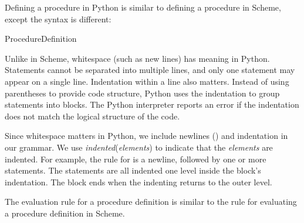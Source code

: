 Defining a procedure in Python is similar to defining a procedure in Scheme, except the syntax is different:
\begin{bnfgrammarm}{ProcedureDefinition}
\ \\
\end{bnfgrammarm}

Unlike in Scheme, whitespace (such as new lines) has meaning in Python. Statements cannot be separated into multiple lines, and only one statement may appear on a single line. Indentation within a line also matters. Instead of using parentheses to provide code structure, Python uses the indentation to group statements into blocks. The Python interpreter reports an error if the indentation does not match the logical structure of the code.

Since whitespace matters in Python, we include newlines () and indentation in our grammar.  We use \emph{indented}(\emph{elements})
to indicate that the \emph{elements} are indented.  For example, the rule for  is a newline, followed by one or more statements.  The statements are all indented one level inside the block's indentation.  The block ends when the indenting returns to the outer level.

The evaluation rule for a procedure definition is similar to the rule for evaluating a procedure definition in Scheme.

